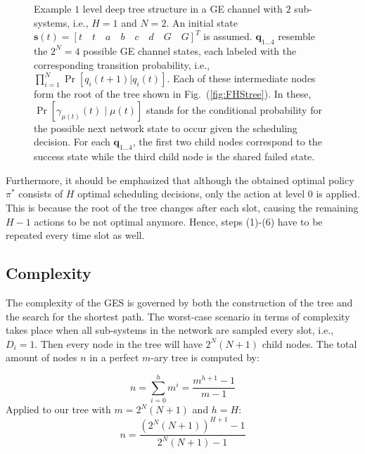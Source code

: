 \begin{sidewaysfigure}
	\centering
   
  \caption[GES: Example tree structure for $N=2$ and $H=1$]{Example $1$ level
  deep tree structure in a GE channel with $2$ sub-systems, i.e., $H=1$ and
  $N=2$. An initial state $\boldsymbol{s}(t)=\left[t\quad t\quad a\quad b\quad
  c\quad d\quad G\quad G \right]^T$ is assumed. $\boldsymbol{q}_ {1\dots 4}$
  resemble the $2^N=4$ possible GE channel states, each labeled with the
  corresponding transition probability, i.e., $\prod_{i=1}^{N}{\Pr[q_i(t+1)
  |q_i(t)]}$. Each of these intermediate nodes form the root of the tree shown
  in Fig.~(\ref{fig:FHStree}). In these, $\Pr[\gamma_{\mu(t)}(t)\mid \mu(t)]$
  stands for the conditional probability for the possible next network state to
  occur given the scheduling decision. For each $\boldsymbol{q}_{1\dots 4}$, the
  first two child nodes correspond to the success state while the third child
  node is the shared failed state.}
	\label{fig:GEStree}
\end{sidewaysfigure}

Furthermore, it should be emphasized that although the obtained optimal policy
$\pi^*$ consists of $H$ optimal scheduling decisions, only the action at level 0
is applied. This is because the root of the tree changes after each slot,
causing the remaining $H-1$ actions to be not optimal anymore. Hence, steps
(1)-(6) have to be repeated every time slot as well. 

\subsection{Complexity}

The complexity of the GES is governed by both the construction of the tree and
the search for the shortest path. The worst-case scenario in terms of complexity
takes place when all sub-systems in the network are sampled every slot, i.e.,
$D_i=1$. Then every node in the tree will have $2^N(N+1)$ child nodes. The total
amount of nodes $n$ in a perfect $m$-ary tree is computed by:

\begin{equation}
  n = \sum_{i=0}^{h}m^i = \frac{m^{h+1}-1}{m-1}
\end{equation}
Applied to our tree with $m=2^N(N+1)$ and $h=H$: 
\begin{equation}
  n = \frac{(2^N(N+1))^{H+1}-1}{2^N(N+1)-1} 
\end{equation} 

